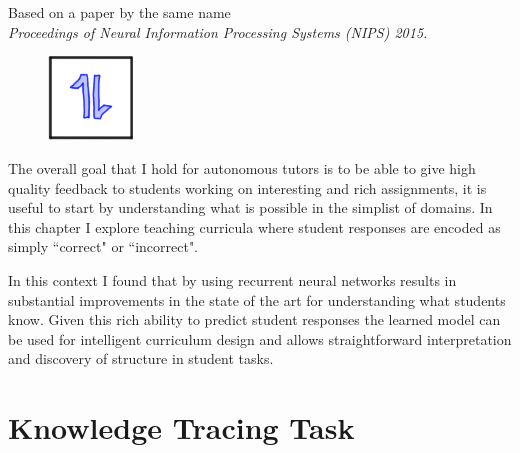 Based on a paper by the same name \\ \emph{Proceedings of Neural Information Processing Systems (NIPS) 2015.}

\vspace{7mm}

\begin{figure}[h!]
\includegraphics[width=0.2\textwidth]{img/assnType_1}
\end{figure}

\vspace{7mm}

The overall goal that I hold for autonomous tutors is to be able to give high quality feedback to students working on interesting and rich assignments, it is useful to start by understanding what is possible in the simplist of domains. In this chapter I explore teaching curricula where student responses are encoded as simply ``correct" or ``incorrect". 

In this context I found that by using recurrent neural networks results in substantial improvements in the state of the art for understanding what students know. Given this rich ability to predict student responses the learned model can be used for intelligent curriculum design and allows straightforward interpretation and discovery of structure in student tasks. 

\section{Knowledge Tracing Task}


